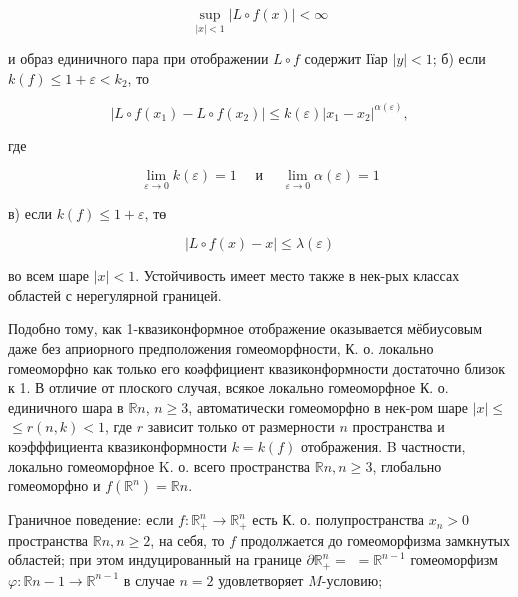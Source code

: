 \documentclass[10pt]{article}
\begin{document}
\[

\sup _{|x|<1}|L \circ f(x)|<\infty

\]



и образ единичного пара при отображении $L \circ f$ содержит Iїар $|y|<1$; б) если $k(f) \leqslant 1+\varepsilon<k_{2}$, то



\[

\left|L \circ f\left(x_{1}\right)-L \circ f\left(x_{2}\right)\right| \leqslant k(\varepsilon)\left|x_{1}-x_{2}\right|^{\alpha(\varepsilon)},

\]



где



\[

\lim _{\varepsilon \rightarrow 0} k(\varepsilon)=1 \quad \text { и } \quad \lim _{\varepsilon \rightarrow 0} \alpha(\varepsilon)=1

\]



в) если $k(f) \leqslant 1+\varepsilon$, тө



\[

|L \circ f(x)-x| \leqslant \lambda(\varepsilon)

\]



во всем шаре $|x|<1$. Устойчивость имеет место также в нек-рых классах областей с нерегулярной границей.



Подобно тому, как 1-квазиконформное отображение оказывается мёбиусовым даже без априорного предположения гомеоморфности, К. о. локально гомеоморфно как только его коәффициент квазиконформности достаточно близок к 1. В отличие от плоского случая, всякое локально гомеоморфное К. о. единичного шара в $\mathbb{R} n$, $n \geqslant 3$, автоматически гомеоморфно в нек-ром шаре $|x| \leqslant$ $\leqslant r(n, k)<1$, где $r$ зависит только от размерности $n$ пространства и коэфффициента квазиконформности $k=k(f)$ отображения. B частности, локально гомеоморфное K. о. всего пространства $\mathbb{R} n, n \geqslant 3$, глобально гомеоморфно и $f\left(\mathbb{R}^{n}\right)=\mathbb{R} n$.



Граничное поведение: если $f: \mathbb{R}_{+}^{n} \rightarrow \mathbb{R}_{+}^{n}$ есть К. о. полупространства $x_{n}>0$ пространства $\mathbb{R} n, n \geqslant 2$, на себя, то $f$ продолжается до гомеоморфизма замкнутых областей; при этом индуцированный на границе $\partial \mathbb{R}_{+}^{n}=$ $=\mathbb{R}^{n-1}$ гомеоморфизм $\varphi: \mathbb{R} n-1 \rightarrow \mathbb{R}^{n-1}$ в случае $n=2$ удовлетворяет $M$-условию;
\end{document}
